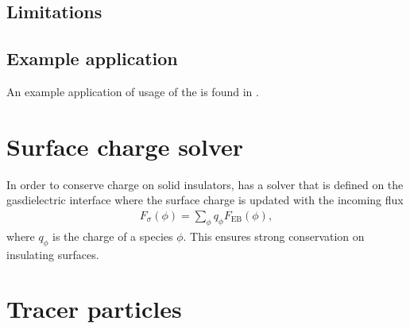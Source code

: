 \documentclass[letterpaper,10pt,english]{sphinxmanual}
\begin{document}
\subsection{Limitations}
\label{\detokenize{Solvers/RTE:limitations}}

\subsection{Example application}
\label{\detokenize{Solvers/RTE:example-application}}
\sphinxAtStartPar
An example application of usage of the  is found in {\hyperref[\detokenize{Applications/RadiativeTransferModel:chap-radiativetransfermodel}]{}}.

\sphinxstepscope


\section{Surface charge solver}
\label{\detokenize{Solvers/Sigma:surface-charge-solver}}\label{\detokenize{Solvers/Sigma:chap-sigmasolver}}\label{\detokenize{Solvers/Sigma::doc}}
\sphinxAtStartPar
In order to conserve charge on solid insulators,  has a solver that is defined on the gas\sphinxhyphen{}dielectric interface where the surface charge is updated with the incoming flux
\begin{equation*}
\begin{split}F_\sigma(\phi) = \sum_{\phi}q_\phi F_{\textrm{EB}}(\phi),\end{split}
\end{equation*}
\sphinxAtStartPar
where \(q_\phi\) is the charge of a species \(\phi\). This ensures strong conservation on insulating surfaces.

\sphinxstepscope


\section{Tracer particles}
\label{\detokenize{Solvers/TracerParticles:tracer-particles}}\label{\detokenize{Solvers/TracerParticles:chap-tracerparticlesolver}}\label{\detokenize{Solvers/TracerParticles::doc}}
\sphinxstepscope
\end{document}
